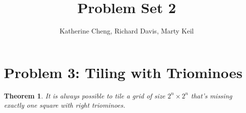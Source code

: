 \documentclass[10pt,letter]{article}
\newtheorem*{thm}{Theorem}
\begin{document}

\title{Problem Set 2}

\author{Katherine Cheng, Richard Davis, Marty Keil}

 
\maketitle 


\section*{Problem 3: Tiling with Triominoes}
\begin{thm}
  It is always possible to tile a grid of size $2^n \times 2^n$ that's missing exactly one square with right triominoes.
\end{thm}
\end{document}
